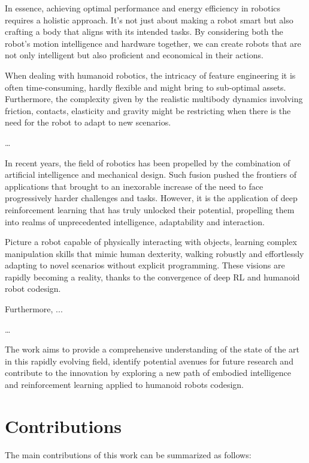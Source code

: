 In essence, achieving optimal performance and energy efficiency in robotics requires a holistic approach. It's not just about making a robot smart but also crafting a body that aligns with its intended tasks. By considering both the robot's motion intelligence and hardware together, we can create robots that are not only intelligent but also proficient and economical in their actions.

When dealing with humanoid robotics, the intricacy of feature engineering it is often time-consuming, hardly flexible and might bring to sub-optimal assets. Furthermore, the complexity given by the realistic multibody dynamics involving friction, contacts, elasticity and gravity might be restricting when there is the need for the robot to adapt to new scenarios.

\dots

In recent years, the field of robotics has been propelled by the combination of artificial intelligence and mechanical design. Such fusion pushed the frontiers of applications that brought to an inexorable increase of the need to face progressively harder challenges and tasks. However, it is the application of deep reinforcement learning that has truly unlocked their potential, propelling them into realms of unprecedented intelligence, adaptability and interaction.

Picture a robot capable of physically interacting with objects, learning complex manipulation skills that mimic human dexterity, walking robustly and effortlessly adapting to novel scenarios without explicit programming. These visions are rapidly becoming a reality, thanks to the convergence of deep \ac{RL} and humanoid robot codesign.

Furthermore, ...

\dots

The work aims to provide a comprehensive understanding of the state of the art in this rapidly evolving field, identify potential avenues for future research and contribute to the innovation by exploring a new path of embodied intelligence and reinforcement learning applied to humanoid robots codesign.

\section{Contributions}

The main contributions of this work can be summarized as follows:

